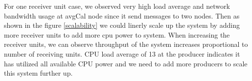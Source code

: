 For one receiver unit case, we observed very high load average and network bandwidth usage at avgCal node since it send messages to two nodes. Then as shown in the figure \ref{scalability} we could linerly scale up the system by adding more receiver units to add more cpu power to system. When increasing the receiver units, we can observe throughput of the system increases proportional to number of receiving units. CPU load average of 13 at the producer indicates it has utilized all available CPU power and we need to add more producers to scale this system further up. 


